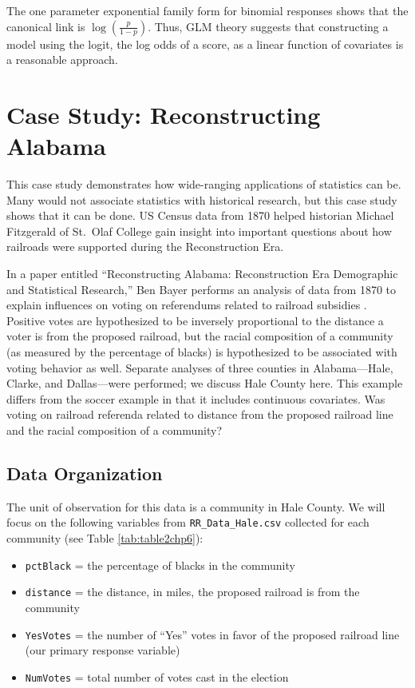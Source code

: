 \documentclass[
]{krantz}
\begin{document}
The one parameter exponential family form for binomial responses shows that the canonical link is \(\log\left(\frac{p}{1-p}\right)\). Thus, GLM theory suggests that constructing a model using the logit, the log odds of a score, as a linear function of covariates is a reasonable approach.

\hypertarget{case-study-reconstructing-alabama}{%
\section{Case Study: Reconstructing Alabama}\label{case-study-reconstructing-alabama}}

This case study demonstrates how wide-ranging applications of statistics can be. Many would not associate statistics with historical research, but this case study shows that it can be done. US Census data from 1870 helped historian Michael Fitzgerald of St.~Olaf College gain insight into important questions about how railroads were supported during the Reconstruction Era.

In a paper entitled ``Reconstructing Alabama: Reconstruction Era Demographic and Statistical Research,'' Ben Bayer performs an analysis of data from 1870 to explain influences on voting on referendums related to railroad subsidies \citep{Bayer2011}. Positive votes are hypothesized to be inversely proportional to the distance a voter is from the proposed railroad, but the racial composition of a community (as measured by the percentage of blacks) is hypothesized to be associated with voting behavior as well. Separate analyses of three counties in Alabama---Hale, Clarke, and Dallas---were performed; we discuss Hale County here. This example differs from the soccer example in that it includes continuous covariates. Was voting on railroad referenda related to distance from the proposed railroad line and the racial composition of a community?

\hypertarget{data-organization-2}{%
\subsection{Data Organization}\label{data-organization-2}}

The unit of observation for this data is a community in Hale County. We will focus on the following variables from \texttt{RR\_Data\_Hale.csv} collected for each community (see Table \ref{tab:table2chp6}):

\begin{itemize}
\item
  \texttt{pctBlack} = the percentage of blacks in the community
\item
  \texttt{distance} = the distance, in miles, the proposed railroad is from the community
\item
  \texttt{YesVotes} = the number of ``Yes'' votes in favor of the proposed railroad line (our primary response variable)
\item
  \texttt{NumVotes} = total number of votes cast in the election
\end{itemize}
\end{document}

